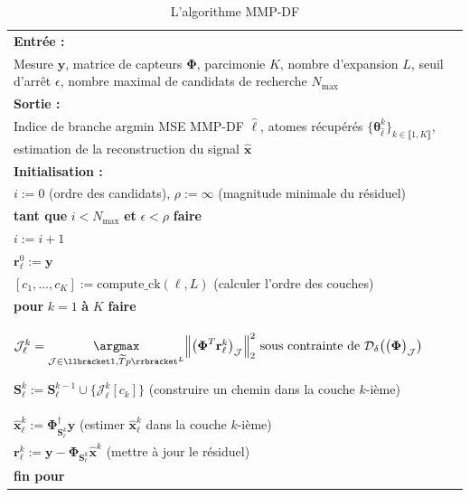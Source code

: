 \documentclass[9pt,a4paper,twoside]{rho}
\begin{document}
\begin{table}[H]
    \centering
    \caption{L'algorithme MMP-DF}
    \renewcommand{\arraystretch}{1.4} 
    \begin{tabular}{>{\arraybackslash}p{9cm}}
        \toprule
        \textbf{Entrée :} \\
        Mesure $\mathbf{y}$, matrice de capteurs $\boldsymbol{\Phi}$, parcimonie $K$, nombre d'expansion $L$, seuil d'arrêt $\epsilon$, nombre maximal de candidats de recherche $N_{\text{max}}$ \\
        \textbf{Sortie :} \\
        Indice de branche argmin MSE MMP-DF $\hat{\ell}$, atomes récupérés $\big\{\boldsymbol{\theta}_{\hat{\ell}}^k\big\}_{k \in \llbracket1, K\rrbracket}$, estimation de la reconstruction du signal $\hat{\mathbf{x}}$ \\
        \textbf{Initialisation :} \\
        $i:= 0$ (ordre des candidats), $\rho := \infty$ (magnitude minimale du résiduel) \\
        
        \midrule
        
        \textbf{tant que} $i < N_{\text{max}}$ \textbf{et} $\epsilon < \rho$ \textbf{faire} \\
    
        \quad $i := i + 1$ \\
        \quad $\mathbf{r}_{\ell}^0 := \mathbf{y}$ \\
        \quad $[c_1, \ldots, c_K] := \text{compute\_ck}(\ell, L)$ \hfill (calculer l'ordre des couches) \\
        
        \quad \textbf{pour} $k = 1$ \textbf{à} $K$ \textbf{faire} \\

        \quad \quad $\mathcal{J}_{\ell}^k = \underset{\mathcal{J} \in \llbracket 1, \widetilde{T}p \rrbracket^L}{\argmax} \Big\| \big( \boldsymbol{\Phi}^T  \mathbf{r}_{\ell}^k \big)_\mathcal{J} \Big\|_2^2 \text{ sous contrainte de } \mathcal{D}_\delta \big(  \big( \boldsymbol{\Phi} \big)_\mathcal{J} \big)$
        
        \quad \quad $\mathbf{S}_{\ell}^k := \mathbf{S}_{\ell}^{k-1} \cup \{\mathcal{J}_{\ell}^k [c_k]\}$ \hfill (construire un chemin dans la couche $k$-ième) \\
        \quad \quad $\hat{\mathbf{x}}_{\ell}^k := \boldsymbol{\Phi}_{\mathbf{S}_{\ell}^k}^\dagger \mathbf{y}$ \hfill (estimer $\hat{\mathbf{x}}_{\ell}^k$ dans la couche $k$-ième) \\
        \quad \quad $\mathbf{r}_{\ell}^k := \mathbf{y} - \boldsymbol{\Phi}_{\mathbf{S}_{\ell}^k} \hat{\mathbf{x}}^k$ \hfill (mettre à jour le résiduel) \\
        \quad \textbf{fin pour} \\
        

\end{tabular}
\end{table}
\end{document}
